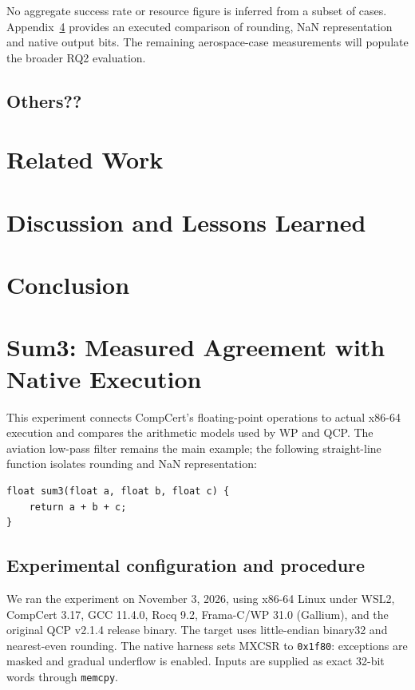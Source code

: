 \documentclass[manuscript, screen, review]{acmart}
\begin{document}
No aggregate success rate or resource figure is inferred from a subset of
cases. Appendix~\ref{app:sum3-baseline} provides an executed comparison of
rounding, NaN representation and native output bits. The remaining
aerospace-case measurements will populate the broader RQ2 evaluation.
 \subsection{Others??}
 

\section{Related Work}

\section{Discussion and Lessons Learned}

\section{Conclusion}





\clearpage
\appendix
\section{Sum3: Measured Agreement with Native Execution}
\label{app:sum3-baseline}

This experiment connects CompCert's floating-point operations to actual
x86-64 execution and compares the arithmetic models used by WP and QCP.
The aviation low-pass filter remains the main example; the following
straight-line function isolates rounding and NaN representation:

\begin{verbatim}
float sum3(float a, float b, float c) {
    return a + b + c;
}
\end{verbatim}

\subsection{Experimental configuration and procedure}

We ran the experiment on November 3, 2026, using x86-64 Linux under WSL2,
CompCert 3.17, GCC 11.4.0, Rocq 9.2, Frama-C/WP 31.0 (Gallium), and the
original QCP v2.1.4 release binary. The target uses little-endian binary32
and nearest-even rounding. The native harness sets MXCSR to
\texttt{0x1f80}: exceptions are masked and gradual underflow is enabled.
Inputs are supplied as exact 32-bit words through \texttt{memcpy}.
\end{document}
